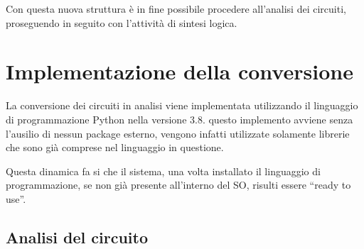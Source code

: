\documentclass[
]{book}
\begin{document}
Con questa nuova struttura è in fine possibile procedere all'analisi dei circuiti, proseguendo in seguito con l'attività di sintesi logica.

\hypertarget{implementazione-della-conversione}{%
\section{Implementazione della conversione}\label{implementazione-della-conversione}}

La conversione dei circuiti in analisi viene implementata utilizzando il linguaggio di programmazione Python nella versione 3.8. questo implemento avviene senza l'ausilio di nessun package esterno, vengono infatti utilizzate solamente librerie che sono già comprese nel linguaggio in questione.

Questa dinamica fa si che il sistema, una volta installato il linguaggio di programmazione, se non già presente all'interno del SO, risulti essere ``ready to use''.

\newpage

\hypertarget{analisi-del-circuito}{%
\subsection{Analisi del circuito}\label{analisi-del-circuito}}
\end{document}
